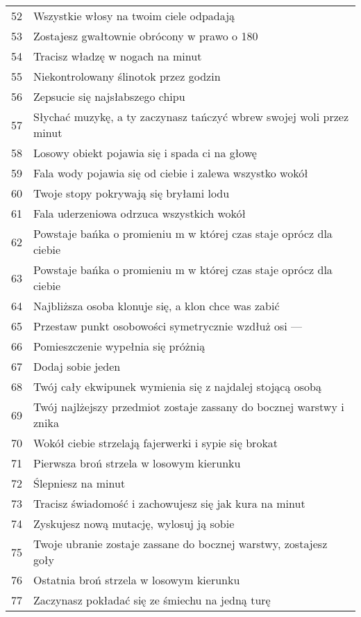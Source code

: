 \begin{longtabu}{ l l }
52			&	Wszystkie włosy na twoim ciele odpadają \\
53			&	Zostajesz gwałtownie obrócony w prawo o 180\textdegree \\
54			&	Tracisz władzę w nogach na \dxx{} minut \\
55			&	Niekontrolowany ślinotok przez \dvi{} godzin \\
56			&	Zepsucie się najsłabszego chipu	\\
57			&	Słychać muzykę, a ty zaczynasz tańczyć wbrew swojej woli przez \dvi{} minut \\
58			&	Losowy obiekt pojawia się i spada ci na głowę \\
59			&	Fala wody pojawia się od ciebie i zalewa wszystko wokół \\
60			&	Twoje stopy pokrywają się bryłami lodu \\
61			&	Fala uderzeniowa odrzuca wszystkich wokół \\
62			&	Powstaje bańka o promieniu \diiii{} m w której czas staje oprócz dla ciebie \\
63			&	Powstaje bańka o promieniu \dxx{} m w której czas staje oprócz dla ciebie \\
64			&	Najbliższa osoba klonuje się, a klon chce was zabić \\
65			&	Przestaw punkt osobowości symetrycznie wzdłuż osi \abh{} --- \abt{} \\
66			&	Pomieszczenie wypełnia się próżnią \\
67			&	Dodaj sobie jeden \abnkp{} \\ 
68			&	Twój cały ekwipunek wymienia się z najdalej stojącą osobą \\
69			&	Twój najlżejszy przedmiot zostaje zassany do bocznej warstwy i znika \\
70			&	Wokół ciebie strzelają fajerwerki i sypie się brokat \\
71			&	Pierwsza broń strzela w losowym kierunku \\
72			&	Ślepniesz na \dvi{} minut \\
73			&	Tracisz świadomość i zachowujesz się jak kura na \dxx{} minut \\
74			&	Zyskujesz nową mutację, wylosuj ją sobie \\
75			&	Twoje ubranie zostaje zassane do bocznej warstwy, zostajesz goły \\
76			&	Ostatnia broń strzela w losowym kierunku \\
77			&	Zaczynasz pokładać się ze śmiechu na jedną turę \\

\end{longtabu}
